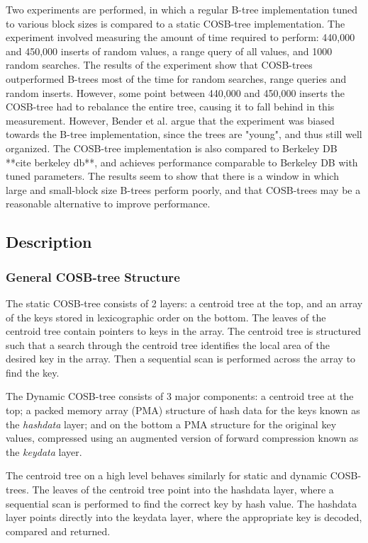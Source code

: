 \documentclass{style}
\begin{document}
Two experiments are performed, in which a regular B-tree implementation tuned to various block sizes is compared to a static COSB-tree implementation. The experiment involved measuring the amount of time required to perform: 440,000 and 450,000 inserts of random values, a range query of all values, and 1000 random searches. The results of the experiment show that COSB-trees outperformed B-trees most of the time for random searches, range queries and random inserts. However, some point between 440,000 and 450,000 inserts the COSB-tree had to rebalance the entire tree, causing it to fall behind in this measurement. However, Bender et al. argue that the experiment was biased towards the B-tree implementation, since the trees are "young", and thus still well organized. The COSB-tree implementation is also compared to Berkeley DB **cite berkeley db**, and achieves performance comparable to Berkeley DB with tuned parameters. The results seem to show that there is a window in which large and small-block size B-trees perform poorly, and that COSB-trees may be a reasonable alternative to improve performance.
\subsection{Description}

\subsubsection{General COSB-tree Structure}
The static COSB-tree consists of 2 layers: a centroid tree at the top, and an array of the keys stored in lexicographic order on the bottom. The leaves of the centroid tree contain pointers to keys in the array. The centroid tree is structured such that a search through the centroid tree identifies the local area of the desired key in the array. Then a sequential scan is performed across the array to find the key.

The Dynamic COSB-tree consists of 3 major components: a centroid tree at the top; a packed memory array (PMA) structure of hash data for the keys known as the \emph{hashdata} layer; and on the bottom a PMA structure for the original key values, compressed using an augmented version of forward compression known as the \emph{keydata} layer.

The centroid tree on a high level behaves similarly for static and dynamic COSB-trees. The leaves of the centroid tree point into the hashdata layer, where a sequential scan is performed to find the correct key by hash value. The hashdata layer points directly into the keydata layer, where the appropriate key is decoded, compared and returned.
\end{document}
